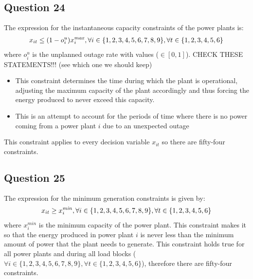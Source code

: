\documentclass[11pt,a4paper]{article}
\begin{document}
\subsection*{Question 24}
The expression for the instantaneous capacity constraints of the power plants is:
\begin{align*}
	x_{it} \leq (1 - o_{i}^{u})x_{i}^{\text{\textit{max}}},	\forall i \in{} \{1,2,3,4,5,6,7,8,9\}, \forall t\in{}\{1,2,3,4,5,6\}\\
\end{align*}
where $o_{i}^{u}$ is the unplanned outage rate with values ($\in{} [0,1]$). 
CHECK THESE STATEMENTS!!! (see which one we should keep)
\begin{itemize}
	\item This constraint determines the time during which the plant is operational, adjusting the maximum capacity of the plant accordingly and thus forcing the energy produced to never exceed this capacity.
	\item This is an attempt to account for the periods of time where there is no power coming from a power plant $i$ due to an unexpected outage 
\end{itemize}
This constraint applies to every decision variable $x_{it}$ so there are fifty-four constraints.

\subsection*{Question 25}
The expression for the minimum generation constraints is given by:
\begin{align*}
	x_{it} \geq x_{i}^{\text{\textit{min}}},	\forall i \in{} \{1,2,3,4,5,6,7,8,9\}, \forall t\in{}\{1,2,3,4,5,6\}\\
\end{align*}
where $x_{i}^{min}$ is the minimum capacity of the power plant. This constraint makes it so that the energy produced in power plant $i$ is never less than the minimum amount of power that the plant needs to generate. This constraint holds true for all power plants and during all load blocks ($\forall i \in{} \{1,2,3,4,5,6,7,8,9\},  \forall t \in{} \{1,2,3,4,5,6\}$), therefore there are fifty-four constraints.
\end{document}
